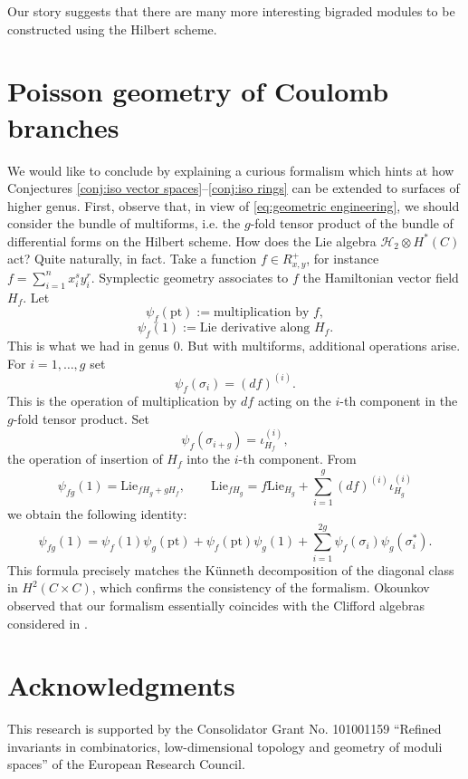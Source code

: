 \documentclass[12pt]{amsart}
\theoremstyle{definition}
\theoremstyle{remark}
\numberwithin{equation}{section}
\begin{document}
	Our story suggests that there are many more interesting bigraded modules to be constructed using the Hilbert scheme.
	
	\section{Poisson geometry of Coulomb branches}
	We would like to conclude by explaining a curious formalism which hints at how Conjectures \ref{conj:iso vector spaces}--\ref{conj:iso rings} can be extended to surfaces of higher genus. First, observe that, in view of \eqref{eq:geometric engineering}, we should consider the bundle of multiforms, i.e. the $g$-fold tensor product of the bundle of differential forms on the Hilbert scheme. How does the Lie algebra $\mathscr{H}_2 \otimes H^*(C)$ act? Quite naturally, in fact. Take a function $f\in R_{x,y}^+$, for instance $f=\sum_{i=1}^n x_i^s y_i^r$. Symplectic geometry associates to $f$ the Hamiltonian vector field $H_f$. Let
	\[
	\psi_f(\mathrm{pt}) := \text{multiplication by $f$},
	\]
	\[
	\psi_f(1) := \text{Lie derivative along $H_f$}.
	\]
	This is what we had in genus $0$. But with multiforms, additional operations arise. For $i=1,\ldots,g$ set
	\[
	\psi_f(\sigma_i) = (d f)^{(i)}.
	\]
	This is the operation of multiplication by $df$ acting on the $i$-th component in the $g$-fold tensor product. Set
	\[
	\psi_f(\sigma_{i+g}) = \iota^{(i)}_{H_f},
	\]
	the operation of insertion of $H_f$ into the $i$-th component. From 
	\[
	\psi_{fg}(1) = \mathrm{Lie}_{f H_g + g H_f}, \qquad
	\mathrm{Lie}_{f H_g} = f \mathrm{Lie}_{H_g} + \sum_{i=1}^g (d f)^{(i)} \iota^{(i)}_{H_g}
	\]
	we obtain the following identity:
	\[
	\psi_{fg}(1) = \psi_f(1) \psi_g(\mathrm{pt}) + \psi_f(\mathrm{pt}) \psi_g(1) + \sum_{i=1}^{2g} \psi_f(\sigma_i) \psi_g(\sigma_i^*).
	\]
	This formula precisely matches the K\"unneth decomposition of the diagonal class in $H^2(C\times C)$, which confirms the consistency of the formalism. Okounkov observed that our formalism essentially coincides with the Clifford algebras considered in \cite{kazhdan2024l}.
	
	\section*{Acknowledgments}
	This research is supported by the Consolidator Grant No. 101001159 ``Refined invariants in combinatorics, low-dimensional topology and geometry of moduli spaces'' of the European Research Council.
	
	
	
	
\end{document}
